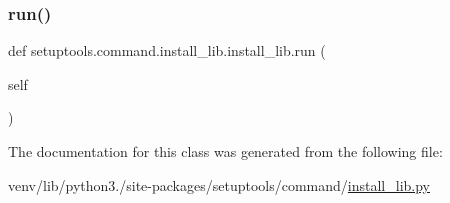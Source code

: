 \subsubsection{\texorpdfstring{run()}{run()}}
{\footnotesize\ttfamily def setuptools.\+command.\+install\+\_\+lib.\+install\+\_\+lib.\+run (\begin{DoxyParamCaption}\item[{}]{self }\end{DoxyParamCaption})}



The documentation for this class was generated from the following file\+:\begin{DoxyCompactItemize}
\item 
venv/lib/python3./site-\/packages/setuptools/command/\hyperlink{command_2install__lib_8py}{install\+\_\+lib.\+py}\end{DoxyCompactItemize}
